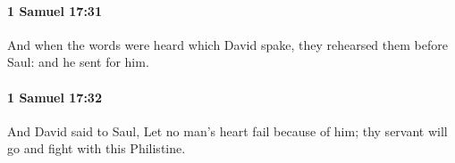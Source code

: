 		\paragraph{1 Samuel 17:31} %
			\label{1SAMUEL-17-31}

			And when the words were heard which David spake, they rehearsed them before Saul: and he sent for him.


		\paragraph{1 Samuel 17:32} %
			\label{1SAMUEL-17-32}

			And David said to Saul, Let no man’s heart fail because of him; thy servant will go and fight with this Philistine.



